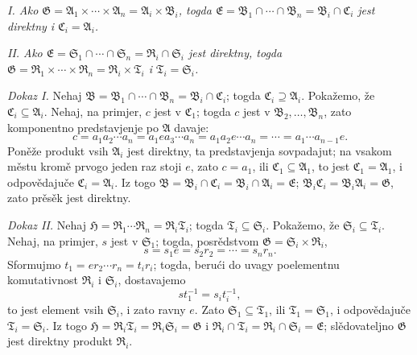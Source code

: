 \documentclass[11pt]{article}
\providecommand{\mG}{\mathfrak{G}}
\providecommand{\mA}{\mathfrak{A}}
\providecommand{\mB}{\mathfrak{B}}
\providecommand{\mE}{\mathfrak{E}}
\providecommand{\mH}{\mathfrak{H}}
\providecommand{\mC}{\mathfrak{C}}
\providecommand{\mR}{\mathfrak{R}}
\providecommand{\mS}{\mathfrak{S}}
\providecommand{\mT}{\mathfrak{T}}
\begin{document}
\emph{I. Ako $\mG=\mA_1\times\cdots\times\mA_n=\mA_i\times\mB_i$, togda $\mE=\mB_1\cap\cdots\cap\mB_n=\mB_i\cap\mC_i$ jest direktny i $\mC_i=\mA_i$.}

\emph{II. Ako $\mE=\mS_1\cap\cdots\cap\mS_n=\mR_i\cap\mS_i$ jest direktny, togda $\mG=\mR_1\times\cdots\times\mR_n=\mR_i\times\mT_i$ i $\mT_i=\mS_i$.}

\emph{Dokaz I.} Nehaj $\mB=\mB_1\cap\cdots\cap\mB_n=\mB_i\cap\mC_i$; togda $\mC_i\supseteq\mA_i$. Pokažemo, že $\mC_i\subseteq\mA_i$. Nehaj, na primjer, $c$ jest v $\mC_1$; togda $c$ jest v $\mB_2,\ldots,\mB_n$, zato komponentno predstavjenje po $\mA$ davaje:
\[
        c=a_1a_2\cdots a_n=a_1ea_3\cdots a_n=a_1a_2e\cdots a_n=\cdots=a_1\cdots a_{n-1}e.
\]
Poněže produkt vsih $\mA_i$ jest direktny, ta predstavjenja sovpadajut; na vsakom městu kromě prvogo jeden raz stoji $e$, zato $c=a_1$, ili $\mC_1\subseteq\mA_1$, to jest $\mC_1=\mA_1$, i odpovědajuče $\mC_i=\mA_i$. Iz togo $\mB=\mB_i\cap\mC_i=\mB_i\cap\mA_i=\mE$; $\mB_i\mC_i=\mB_i\mA_i=\mG$, zato prěsěk jest direktny.

\emph{Dokaz II.} Nehaj $\mH=\mR_1\cdots\mR_n=\mR_i\mT_i$; togda $\mT_i\subseteq\mS_i$. Pokažemo, že $\mS_i\subseteq\mT_i$. Nehaj, na primjer, $s$ jest v $\mS_1$; togda, posrědstvom $\mG=\mS_i\times\mR_i$,
\[
        s=s_1e=s_2r_2=\cdots=s_nr_n.
\]
Sformujmo $t_1=er_2\cdots r_n=t_ir_i$; togda, berući do uvagy poelementnu komutativnost $\mR_i$ i $\mS_i$, dostavajemo
\[
        st_1^{-1}=s_it_i^{-1},
\]
to jest element vsih $\mS_i$, i zato ravny $e$. Zato $\mS_1\subseteq\mT_1$, ili $\mT_1=\mS_1$, i odpovědajuče $\mT_i=\mS_i$. Iz togo $\mH=\mR_i\mT_i=\mR_i\mS_i=\mG$ i $\mR_i\cap\mT_i=\mR_i\cap\mS_i=\mE$; slědovateljno $\mG$ jest direktny produkt $\mR_i$.
\end{document}
